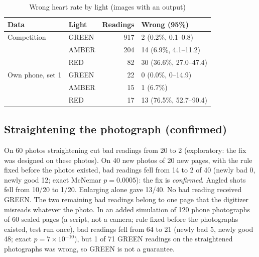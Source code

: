 \documentclass[conference]{IEEEtran}
\begin{document}
\begin{table}[t]
\caption{Wrong heart rate by light (images with an output)}
\label{tab:light}
\centering
\small
\begin{tabular}{llrl}
\toprule
Data & Light & Readings & Wrong (95\%) \\
\midrule
Competition & GREEN & 917 & 2 (0.2\%, 0.1--0.8) \\
 & AMBER & 204 & 14 (6.9\%, 4.1--11.2) \\
 & RED & 82 & 30 (36.6\%, 27.0--47.4) \\
Own phone, set 1 & GREEN & 22 & 0 (0.0\%, 0--14.9) \\
 & AMBER & 15 & 1 (6.7\%) \\
 & RED & 17 & 13 (76.5\%, 52.7--90.4) \\
\bottomrule
\end{tabular}
\end{table}

\subsection{Straightening the photograph (confirmed)}
On 60 photos straightening cut bad readings from 20 to 2 (exploratory: the fix was designed on these photos). On 40 new photos of 20 new pages, with the rule fixed before the photos existed, bad readings fell from 14 to 2 of 40 (newly bad 0, newly good 12; exact McNemar $p=0.0005$): the fix is \emph{confirmed}. Angled shots fell from 10/20 to 1/20. Enlarging alone gave 13/40. No bad reading received GREEN. The two remaining bad readings belong to one page that the digitizer misreads whatever the photo. In an added simulation of 120 phone photographs of 60 sealed pages (a script, not a camera; rule fixed before the photographs existed, test run once), bad readings fell from 64 to 21 (newly bad 5, newly good 48; exact $p=7\times10^{-10}$), but 1 of 71 GREEN readings on the straightened photographs was wrong, so GREEN is not a guarantee.
\end{document}
